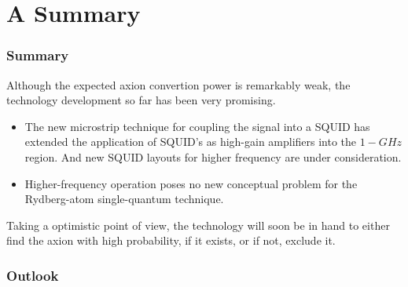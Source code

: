 \documentclass{beamer}
\begin{document}
\section{A Summary}
\begin{frame}
  \frametitle{Summary}
  Although the expected axion convertion power is remarkably weak, the
  technology development so far has been very promising.
  \begin{itemize}
  \item The new microstrip technique for coupling the signal into a SQUID has
    extended the application of SQUID’s as high-gain amplifiers into the
    $1-GHz$ region. And new SQUID layouts for higher frequency are under
    consideration.
  \item Higher-frequency operation poses no new conceptual problem for the
    Rydberg-atom single-quantum technique.
  \end{itemize}
  Taking a optimistic point of view,  the technology will soon be in hand to
  either find the axion with high probability, if it exists, or if not,
  exclude it.
\end{frame}
\begin{frame}
  \frametitle{Outlook}

\end{frame}
\end{document}
